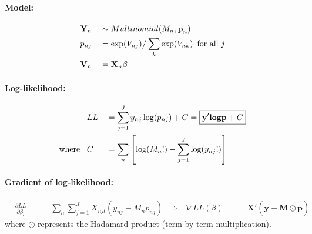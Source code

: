 \documentclass[12pt]{article}
\begin{document}
\paragraph{Model:}
\begin{equation}
\begin{aligned}
	& \textbf{Y}_n && \sim Multinomial(M_n, \textbf{p}_n) \\
	& p_{nj} && = \exp(V_{nj}) \big/ \sum_k \exp(V_{nk}) \hspace*{5pt} \text{for all } j \\
	& \textbf{V}_{n} && = \textbf{X}_n \beta
\end{aligned}
\end{equation}

\paragraph{Log-likelihood: \\}
\begin{equation}
\begin{aligned}
	& LL && = \sum_{j=1}^J y_{nj} \log(p_{nj}) + C = \boxed{ \textbf{y}' \textbf{logp} + C } \\
	\text{where } \hspace*{5pt} & C && =\sum_n \left[ \log(M_n!) - \sum_{j=1}^J \log(y_{nj}!) \right]
\end{aligned}
\end{equation}

\paragraph{Gradient of log-likelihood: \\}
\begin{equation}
\begin{aligned}
	& \frac{\partial LL}{\partial \beta_l} && = \sum_n \sum_{j=1}^J X_{njl} (y_{nj} - M_n p_{nj})
\implies & \nabla LL(\beta) && = \boxed{\textbf{X}' \left( \textbf{y} - \tilde{\textbf{M}} \odot \textbf{p} \right)}
\end{aligned}
\end{equation}
where $\odot$ represents the Hadamard product (term-by-term multiplication).
\end{document}
